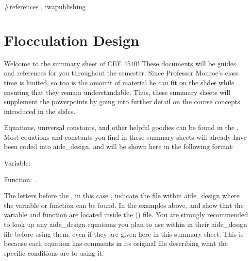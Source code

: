 \documentclass[letterpaper,10pt,english]{sphinxmanual}
\begin{document}
\#references ,
iwapublishing


\chapter{Flocculation Design}
\label{\detokenize{Flocculation/Floc_Design:flocculation-design}}\label{\detokenize{Flocculation/Floc_Design:title-flocculation-design}}\label{\detokenize{Flocculation/Floc_Design::doc}}
Welcome to the  summary sheet of CEE 4540! These documents will be guides and references for you throughout the semester. Since
Professor Monroe’s class time is limited, so too is the amount of material he can fit on the slides while ensuring that they remain
understandable. Thus, these summary sheets will supplement the powerpoints by going into further detail on the course concepts
introduced in the slides.

Equations, universal constants, and other helpful goodies can be found in the . Most equations and constants you find in these summary sheets will already have been coded into aide\_design, and will be shown here in the following format:

\begin{DUlineblock}{0em}
\item[] Variable: 
\item[] Function: .
\end{DUlineblock}

The letters before the , in this case , indicate the file within aide\_design where the variable or function can be found. In the examples above,  and  show that the variable  and function  are located inside the  () file. You are strongly recommended to look up any aide\_design equations you plan to use within in their aide\_design file before using them, even if they are given here in this summary sheet. This is because each equation has comments in its original file describing what the specific conditions are to using it.
\end{document}
